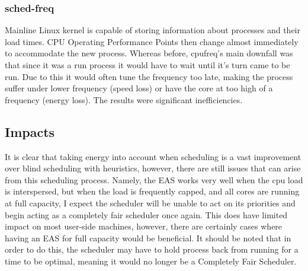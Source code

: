 \subsubsection{sched-freq}
Mainline Linux kernel is capable of storing information about processes and their load times. CPU Operating Performance Points then change almost immediately to accommodate the new process. Whereas before, cpufreq's main downfall was that since it was a run process it would have to wait until it's turn came to be run. Due to this it would often tune the frequency too late, making the process suffer under lower frequency (speed loss) or have the core at too high of a frequency (energy loss). The results were significant inefficiencies.\cite{EASp2015}

\subsection{Impacts}
It is clear that taking energy into account when scheduling is a vast improvement over blind scheduling with heuristics, however, there are still issues that can arise from this scheduling process. Namely, the EAS works very well when the cpu load is interspersed, but when the load is frequently capped, and all cores are running at full capacity, I expect the scheduler will be unable to act on its priorities and begin acting as a completely fair scheduler once again. This does have limited impact on most user-side machines, however, there are certainly cases where having an EAS for full capacity would be beneficial. It should be noted that in order to do this, the scheduler may have to hold process back from running for a time to be optimal, meaning it would no longer be a Completely Fair Scheduler.